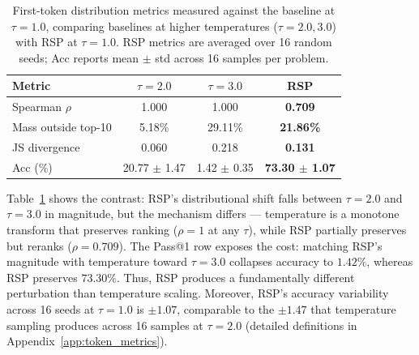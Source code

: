 \begin{table}
  \vspace{-1.2em}
  \centering
  \caption{First-token distribution metrics measured against the baseline at $\tau{=}1.0$, comparing baselines at higher temperatures ($\tau{=}2.0, 3.0$) with RSP at $\tau{=}1.0$. RSP metrics are averaged over 16 random seeds; Acc reports mean $\pm$ std across 16 samples per problem.}
  \label{tab:rsp_vs_temp}
  \footnotesize
  \setlength{\tabcolsep}{3.5pt}
  \renewcommand{\arraystretch}{0.9}
  \begin{tabular}{lccc}
    \toprule
    \textbf{Metric} & \textbf{$\tau{=}2.0$} & \textbf{$\tau{=}3.0$} & \cellcolor{blue!10}\textbf{RSP} \\
    \midrule
    Spearman $\rho$ & 1.000 & 1.000 & \cellcolor{blue!10}\textbf{0.709} \\
    Mass outside top-10 & 5.18\% & 29.11\% & \cellcolor{blue!10}\textbf{21.86\%} \\
    JS divergence & 0.060 & 0.218 & \cellcolor{blue!10}\textbf{0.131} \\
    Acc (\%) & 20.77 $\pm$ 1.47 & 1.42 $\pm$ 0.35 & \cellcolor{blue!10}\textbf{73.30 $\pm$ 1.07} \\
    \bottomrule
  \end{tabular}
\end{table}
Table~\ref{tab:rsp_vs_temp} shows the contrast: RSP's distributional shift falls between $\tau{=}2.0$ and $\tau{=}3.0$ in magnitude, but the mechanism differs --- temperature is a monotone transform that preserves ranking ($\rho=1$ at any $\tau$), while RSP partially preserves but reranks ($\rho=0.709$). The Pass@1 row exposes the cost: matching RSP's magnitude with temperature toward $\tau{=}3.0$ collapses accuracy to $1.42\%$, whereas RSP preserves $73.30\%$. Thus, RSP produces a fundamentally different perturbation than temperature scaling. Moreover, RSP's accuracy variability across 16 seeds at $\tau{=}1.0$ is $\pm 1.07$, comparable to the $\pm 1.47$ that temperature sampling produces across 16 samples at $\tau{=}2.0$ (detailed definitions in Appendix~\ref{app:token_metrics}).

